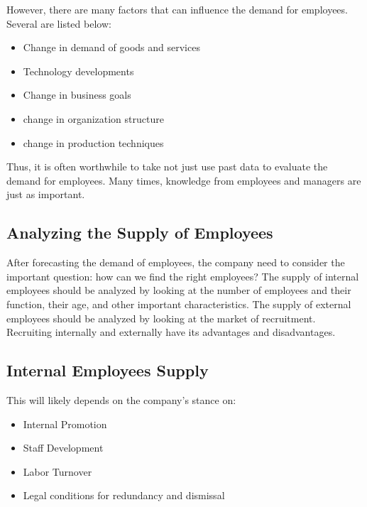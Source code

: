 \documentclass{report}
\begin{document}
However, there are many factors that can influence the demand for employees.
Several are listed below:
\begin{itemize}
	\item Change in demand of goods and services
	\item Technology developments
	\item Change in business goals
	\item change in organization structure
	\item change in production techniques
\end{itemize}
Thus, it is often worthwhile to take not just use past data to evaluate the demand for employees.
Many times, knowledge from employees and managers are just as important.

\subsection{Analyzing the Supply of Employees}
After forecasting the demand of employees, the company need to consider the important question: how can we find the right employees?
The supply of internal employees should be analyzed by looking at the number of employees and their function, their age, and other important characteristics.
The supply of external employees should be analyzed by looking at the market of recruitment.
Recruiting internally and externally have its advantages and disadvantages.

\begin{center}
\end{center}

\subsection{Internal Employees Supply}
This will likely depends on the company's stance on:
\begin{itemize}
	\item Internal Promotion
	\item Staff Development
	\item Labor Turnover
	\item Legal conditions for redundancy and dismissal
\end{itemize}
\end{document}
